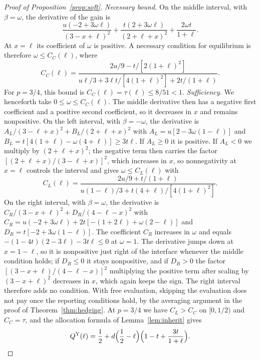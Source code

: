 \documentclass[sigconf,anonymous,review]{acmart}
\numberwithin{equation}{section}
\newcommand{\QY}{Q^{\mathrm{Y}}}
\begin{document}
\begin{proof}[Proof of Proposition~\ref{prop:soft}]
\emph{Necessary bound.} On the middle interval, with $\beta=\omega$, the derivative of the gain is
\[
\frac{u(-2+3\omega\ell)}{(3-x+\ell)^2}+\frac{t(2+3\omega\ell)}{(2+\ell+x)^2}+\frac{2\omega t}{1+\ell}.
\]
At $x=\ell$ its coefficient of $\omega$ is positive. A necessary condition
for equilibrium is therefore $\omega\le C_C(\ell)$, where
\[
C_C(\ell)=\frac{2u/9-t/[2(1+\ell)^2]}{u\ell/3+3\ell t/[4(1+\ell)^2]+2t/(1+\ell)} .
\]
For $p=3/4$, this bound is $C_C(\ell)=\tau(\ell)\le8/51<1$.
\emph{Sufficiency.} We henceforth take $0\le\omega\le C_C(\ell)$.
The middle derivative then has a negative first coefficient and a positive
second coefficient, so it decreases in $x$ and remains nonpositive.
On the left interval, with $\beta=-\omega$, the derivative is
$A_L/(3-\ell+x)^2+B_L/(2+\ell+x)^2$ with $A_L=u[2-3\omega(1-\ell)]$ and
$B_L=t[4(1+\ell)-\omega(4+\ell)]\ge3t\ell$. If $A_L\ge0$ it is positive. If
$A_L<0$ we multiply by $(2+\ell+x)^2$; the negative term then carries the factor
$[(2+\ell+x)/(3-\ell+x)]^2$, which increases in $x$, so nonnegativity at
$x=\ell$ controls the interval and gives $\omega\le C_L(\ell)$ with
\[
C_L(\ell)=\frac{2u/9+t/(1+\ell)}{u(1-\ell)/3+t(4+\ell)/[4(1+\ell)^2]} .
\]
On the right interval, with $\beta=\omega$, the derivative is
$C_R/(3-x+\ell)^2+D_R/(4-\ell-x)^2$ with
$C_R=u(-2+3\omega\ell)+2t[-(1+2\ell)+\omega(2-\ell)]$ and
$D_R=t[-2+3\omega(1-\ell)]$. The coefficient $C_R$ increases in $\omega$ and
equals $-(1-4t)(2-3\ell)-3t\ell\le0$ at $\omega=1$. The derivative jumps down at
$x=1-\ell$, so it is nonpositive just right of the interface whenever the
middle condition holds; if $D_R\le0$ it stays nonpositive, and if $D_R>0$ the
factor $[(3-x+\ell)/(4-\ell-x)]^2$ multiplying the positive term after scaling
by $(3-x+\ell)^2$ decreases in $x$, which again keeps the sign. The right
interval therefore adds no condition. With free evaluation, skipping the
evaluation does not pay once the reporting conditions hold, by the averaging
argument in the proof of Theorem~\ref{thm:hedging}. At $p=3/4$ we have
$C_L>C_C$ on $[0,1/2)$ and $C_C=\tau$, and the allocation formula of
Lemma~\ref{lem:inherit} gives
\[
\QY(\ell)=\frac12+d\Bigl(\frac12-\ell\Bigr)\Bigl(1-t+\frac{3t}{1+\ell}\Bigr).\qedhere
\]
\end{proof}
\end{document}

